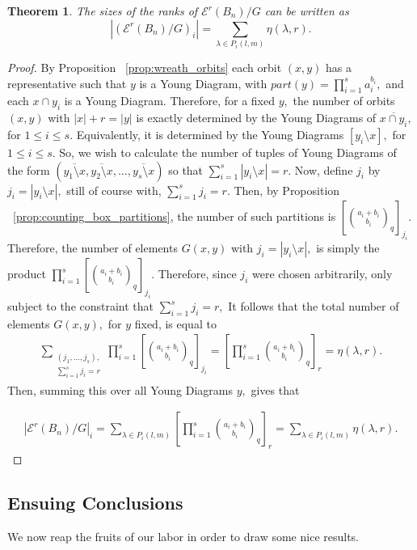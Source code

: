 \documentclass[10 pt]{amsart}
\theoremstyle{plain}
\newtheorem{thm}{Theorem}[section]
\theoremstyle{definition}
\theoremstyle{remark}
\numberwithin{equation}{section}
\newcommand\ssec{\subsection}
\begin{document}
\begin{thm}
\label{thm:quotiented_edge_wreath}
The sizes of the ranks of $\mathcal E^r(B_n)/G$ can be written as 
$$|(\mathcal E^r(B_n)/G)_i| = \sum_{\lambda \in P_i(l,m)} \eta(\lambda,r).$$
\end{thm}
\begin{proof}

By Proposition ~\ref{prop:wreath_orbits} each orbit $(x, y)$ has a representative such that $y$ is a Young Diagram, with $part(y) = \prod_{i=1}^s a_i^{b_i},$ and each $x \cap y_i$ is a Young Diagram. Therefore, for a fixed $y,$ the number of orbits $(x, y)$ with $|x|+r = |y|$ is exactly determined by the Young Diagrams of $\overline{x \cap y_i},$ for $1 \leq i \leq s.$ Equivalently, it is determined by the Young Diagrams $[y_i \setminus x],$ for $1 \leq i \leq s.$ So, we wish to calculate the number of tuples of Young Diagrams of the form $(\overline{y_1 \setminus x},\overline{y_2 \setminus x},\ldots, \overline{y_s \setminus x})$ so that $\sum_{i=1}^s |y_i \setminus x| = r.$ Now, define $j_i$ by $j_i = |y_i \setminus x|,$ still of course with, $\sum_{i=1}^s j_i = r.$ Then, by Proposition ~\ref{prop:counting_box_partitions}, the number of such partitions is $[\binom {a_i+b_i} {b_i}_q]_{j_i}.$ Therefore, the number of elements $G(x, y)$ with $j_i = |y_i \setminus x|,$ is simply the product $\prod_{i=1}^s [\binom {a_i+b_i} {b_i}_q]_{j_i}.$ Therefore, since $j_i$ were chosen arbitrarily, only subject to the constraint that $\sum_{i=1}^s j_i = r,$ It follows that the total number of elements $G(x, y),$ for $y$ fixed, is equal to 
\begin{align*}
\sum_{\substack{{(j_1,\ldots, j_s),}\\{\sum_{i=1}^s j_i = r}}} \prod_{i=1}^s \left[\binom {a_i+b_i} {b_i}_q\right]_{j_i} = \left[\prod_{i=1}^s \binom {a_i+b_i} {b_i}_q\right]_{r} = \eta(\lambda,r).
\end{align*}
Then, summing this over all Young Diagrams $y,$ gives that

\begin{align*}
|\mathcal E^r(B_n)/G|_i = \sum_{\lambda \in P_i(l,m)}  \left[\prod_{i=1}^s \binom {a_i+b_i} {b_i}_q\right]_{r} = \sum_{\lambda \in P_i(l,m)} \eta(\lambda,r).
\end{align*}

\end{proof}

\ssec{Ensuing Conclusions}
We now reap the fruits of our labor in order to draw some nice results.
\end{document}
